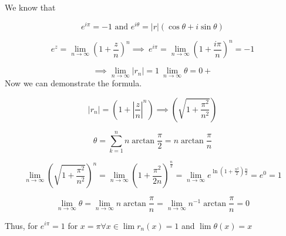 We know that

\[
	e^{i\pi} = -1 \text{ and } e^{i\theta} = |r|(\cos{\theta} + i\sin{\theta})
\]

\[
	e^{z} = \lim_{n \to \infty} {\left( 1 + \frac{z}{n}\right)}^n \implies\ e^{i\pi} = \lim_{n \to \infty} {\left( 1 + \frac{i\pi}{n}\right)}^n = -1
\]

\[
	\implies \lim_{n \to \infty} |r_n| = 1\ \lim_{n \to \infty} \theta = 0+
\]
 Now we can demonstrate the formula.

\[
	|r_n| = \left( 1 + \left|\frac{z}{n}\right|^n \right) \implies \left( \sqrt{1 + \frac{\pi^2}{n^2}}\right)
\]

\[
	\theta = \sum_{k = 1}^{n} n \arctan \frac{\pi}{2} = n \arctan \frac{\pi}{n}
\]

\[
	\lim_{n \to \infty} {\left( \sqrt{1 + \frac{\pi^2}{n^2}}\right)}^n = \lim_{n \to \infty} {\left( 1 + \frac{\pi^2}{2n} \right) }^{\frac{n}{2}}
	= \lim_{n \to \infty} e^{\ln\left(1 +\frac{\pi^2}{2}\right) \frac{n}{2}} = e^0 = 1
\]

\[
	\lim_{n \to \infty} \theta = \lim_{n \to \infty} n \arctan \frac{\pi}{n} = \lim_{n \to \infty} n^{-1} \arctan\frac{\pi}{n} = 0
\]

Thus, for \(e^{i\pi} = 1\) for \(x = \pi \forall x \in \lim r_n (x) = 1\) and \( \lim \theta (x) = x\)

\QED
